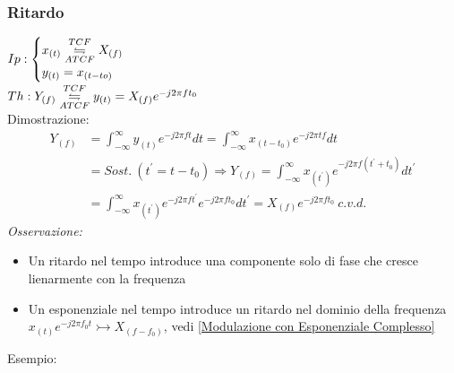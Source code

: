         \subsubsection{Ritardo}\label{Ritardo}
            $Ip: \begin{cases}
                x_{(t)} \overunderset{TCF}{ATCF}{\leftrightharpoons} X_{(f)} \nonumber \\
                y_{(t)} = x_{(t-to)} \nonumber
            \end{cases}$\\
            $Th: Y_{(f)} \overunderset{TCF}{ATCF}{\leftrightharpoons} y_{(t)} = X_{(f)}e^{-j2\pi ft_0}$\\ 
            Dimostrazione:
            \begin{align}
                Y_{(f)} & = \int_{-\infty}^{\infty} y_{(t)} e^{-j2\pi ft} dt = \int_{-\infty}^{\infty} x_{(t-t_0)} e^{-j2\pi tf} dt \nonumber \\
                        & =Sost.\ (t^\prime = t-t_0) \Rightarrow  Y_{(f)} = \int_{-\infty}^{\infty} x_{(t^\prime)} e^{-j2\pi f(t^\prime+t_0)} dt^\prime \nonumber \\
                        & =\int_{-\infty}^{\infty} x_{(t^\prime)} e^{-j2\pi ft^\prime}e^{-j2\pi ft_0} dt^\prime= X_{(f)}e^{-j2\pi ft_0}\ c.v.d.  \nonumber
            \end{align}
            {\em Osservazione:}
                \begin{itemize}
                    \item Un ritardo nel tempo introduce una componente solo di fase che cresce lienarmente con la frequenza
                    \item Un esponenziale nel tempo introduce un ritardo nel dominio della frequenza $x_{(t)}e^{-j2\pi f_0t} \rightarrowtail X_{(f-f_0)}$, vedi \ref{Modulazione con Esponenziale Complesso}
                \end{itemize}
            Esempio:\\
